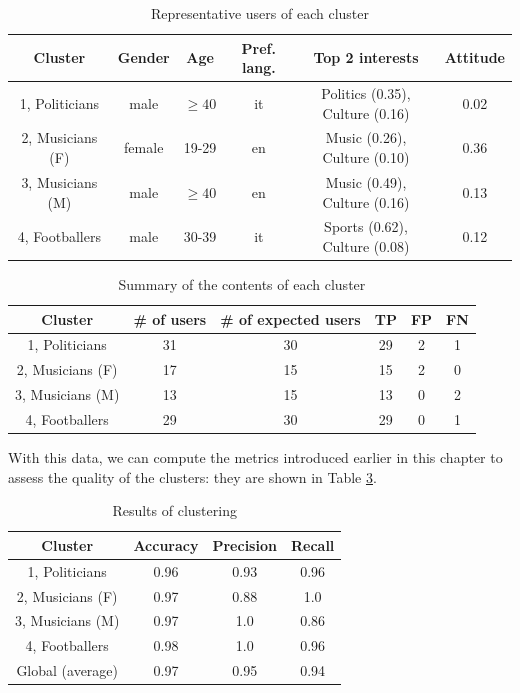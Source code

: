 \begin{table}[]
\centering
\begin{tabular}{|c|c|c|c|c|c|}
    \hline
    \textbf{Cluster} & \textbf{Gender} & \textbf{Age} & \textbf{Pref. lang.} & \textbf{Top 2 interests} & \textbf{Attitude} \\
    \hline
    1, Politicians & male & $\geq 40$ & it & Politics (0.35), Culture (0.16) & 0.02 \\
    \hline
    2, Musicians (F) & female & 19-29 & en & Music (0.26), Culture (0.10) & 0.36 \\
    \hline
    3, Musicians (M) & male & $\geq 40$ & en & Music (0.49), Culture (0.16) & 0.13 \\
    \hline
    4, Footballers & male & 30-39 & it & Sports (0.62), Culture (0.08) & 0.12 \\
    \hline
\end{tabular}
\caption{Representative users of each cluster}
\label{table:repr_users}
\end{table}

\begin{table}[]
\centering
\begin{tabular}{|c|c|c|c|c|c|}
    \hline
    \textbf{Cluster} & \textbf{\# of users} & \textbf{\# of expected users} & \textbf{TP} & \textbf{FP} & \textbf{FN}\\
    \hline
    1, Politicians & 31 & 30 & 29 & 2 & 1\\
    \hline
    2, Musicians (F) & 17 & 15 & 15 & 2 & 0 \\
    \hline
    3, Musicians (M) & 13 & 15 & 13 & 0 & 2 \\
    \hline
    4, Footballers & 29 & 30 & 29 & 0 & 1 \\
    \hline
\end{tabular}
\caption{Summary of the contents of each cluster}
\label{table:summary_clusters}
\end{table}

With this data, we can compute the metrics introduced earlier in this chapter to assess the quality of the clusters: they are shown in Table \ref{table:results}.

\begin{table}[h]
\centering
\begin{tabular}{|c|c|c|c|}
    \hline
    \textbf{Cluster} & \textbf{Accuracy} & \textbf{Precision} & \textbf{Recall} \\
    \hline
    1, Politicians & 0.96 & 0.93 & 0.96 \\
    \hline
    2, Musicians (F) & 0.97 & 0.88 & 1.0 \\
    \hline
    3, Musicians (M) & 0.97 & 1.0 & 0.86 \\
    \hline
    4, Footballers & 0.98 & 1.0 & 0.96 \\
    \hline
    Global (average) & 0.97 & 0.95 & 0.94 \\
    \hline
\end{tabular}
\caption{Results of clustering}
\label{table:results}
\end{table}

